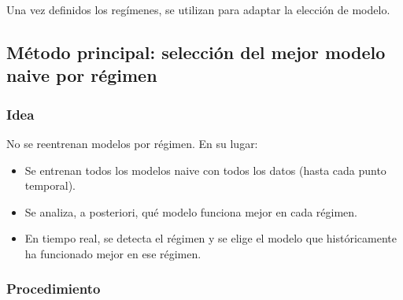 \documentclass[12pt]{article}
\begin{document}
Una vez definidos los regímenes, se utilizan para adaptar la elección de modelo.

\subsection{Método principal: selección del mejor modelo naive por régimen}

\subsubsection*{Idea}

No se reentrenan modelos por régimen. En su lugar:

\begin{itemize}
    \item Se entrenan todos los modelos naive con todos los datos (hasta cada punto temporal).
    \item Se analiza, a posteriori, qué modelo funciona mejor en cada régimen.
    \item En tiempo real, se detecta el régimen y se elige el modelo que históricamente ha funcionado mejor en ese régimen.
\end{itemize}

\subsubsection*{Procedimiento}
\end{document}
